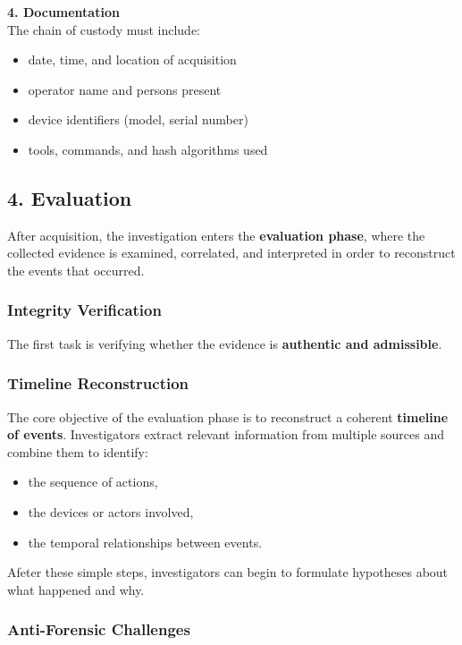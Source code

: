 \noindent
\textbf{4. Documentation}\\
\noindent
The chain of custody must include:

\begin{itemize}
\item date, time, and location of acquisition
\item operator name and persons present
\item device identifiers (model, serial number)
\item tools, commands, and hash algorithms used
\end{itemize}

\subsection{4. Evaluation}

After acquisition, the investigation enters the \textbf{evaluation phase}, where the collected evidence is examined, correlated, and interpreted in order to reconstruct the events that occurred.

\subsubsection{Integrity Verification}

The first task is verifying whether the evidence is \textbf{authentic and admissible}.

\subsubsection{ Timeline Reconstruction}

The core objective of the evaluation phase is to reconstruct a coherent \textbf{timeline of events}.  
Investigators extract relevant information from multiple sources and combine them to identify:

\begin{itemize}
\item the sequence of actions,
\item the devices or actors involved,
\item the temporal relationships between events.
\end{itemize}

\noindent
Afeter these simple steps, investigators can begin to formulate hypotheses about what happened and why.

\subsubsection*{Anti-Forensic Challenges}

